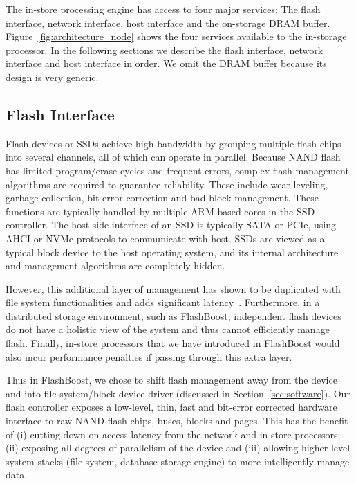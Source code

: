 The in-store processing engine has access to four major services: The flash
interface, network interface, host interface and the on-storage DRAM buffer.
Figure~\ref{fig:architecture_node} shows the four services available to the
in-storage processor. In the following sections we describe the flash interface,
network interface and host interface in order. We omit the DRAM buffer because
its design is very generic.

\subsection{Flash Interface}

Flash devices or SSDs achieve high bandwidth by grouping multiple flash chips
into several channels, all of which can operate in parallel. Because NAND flash
has limited program/erase cycles and frequent errors, complex flash management
algorithms are required to guarantee reliability. These include wear leveling,
garbage collection, bit error correction and bad block management. These
functions are typically handled by multiple ARM-based cores in the SSD
controller. The host side interface of an SSD is typically SATA or PCIe, using
AHCI or NVMe protocols to communicate with host. SSDs are viewed
as a typical block device to the host operating system, and its internal
architecture and management algorithms are completely hidden. 

However, this additional layer of management has shown to be duplicated with
file system functionalities and adds significant latency~\cite{redo}.
Furthermore, in a distributed storage environment, such as FlashBoost,
independent flash devices do not have a holistic view of the system and thus
cannot efficiently manage flash. Finally, in-store processors that we have
introduced in FlashBoost would also incur performance penalties if passing
through this extra layer. 

Thus in FlashBoost, we chose to shift flash management
away from the device and into file system/block device driver (discussed in
Section~\ref{sec:software}). Our flash controller exposes a low-level, thin,
fast and bit-error corrected hardware interface to raw NAND flash chips, buses,
blocks and pages. This has the benefit of (i) cutting down on access latency
from the network and in-store processors; (ii) exposing all degrees of
parallelism of the device and (iii) allowing higher level system stacks (file
system, database storage engine) to more intelligently manage data. 

